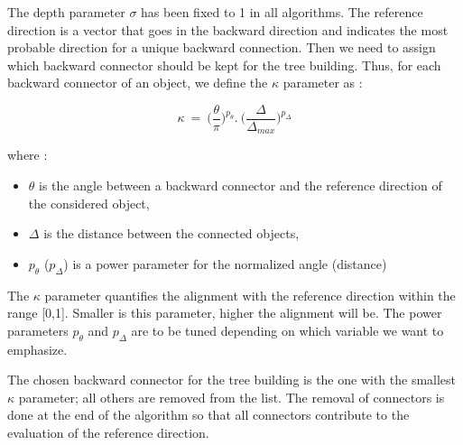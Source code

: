 \documentclass[cits]{JINST}
\begin{document}
The depth parameter $\sigma$ has been fixed to 1 in all algorithms. The reference direction is a vector that goes in the backward direction and indicates the most probable direction for a unique backward connection. Then we need to assign which backward connector should be kept for the tree building. Thus, for each backward connector of an object, we define the $\kappa$ parameter as :

\begin{equation}
  \kappa~=~\Big(\frac{\theta}{\pi}\Big)^{p_{\theta}} . ~\Big(\frac{\Delta}{\Delta_{max}}\Big)^{p_{\Delta}} 
\end{equation}

where :

\begin{itemize}
  \item $\theta$ is the angle between a backward connector and the reference direction of the considered object,
  \item $\Delta$ is the distance between the connected objects,
  \item $p_{\theta}$ ($p_{\Delta}$) is a power parameter for the normalized angle (distance)
\end{itemize}

The $\kappa$ parameter quantifies the alignment with the reference direction within the range [0,1]. Smaller is this parameter, higher the alignment will be. The power parameters $p_{\theta}$ and $p_{\Delta}$ are to be tuned depending on which variable we want to emphasize.

The chosen backward connector for the tree building is the one with the smallest $\kappa$ parameter; all others are removed from the list. The removal of connectors is done at the end of the algorithm so that all connectors contribute to the evaluation of the reference direction.
\end{document}
